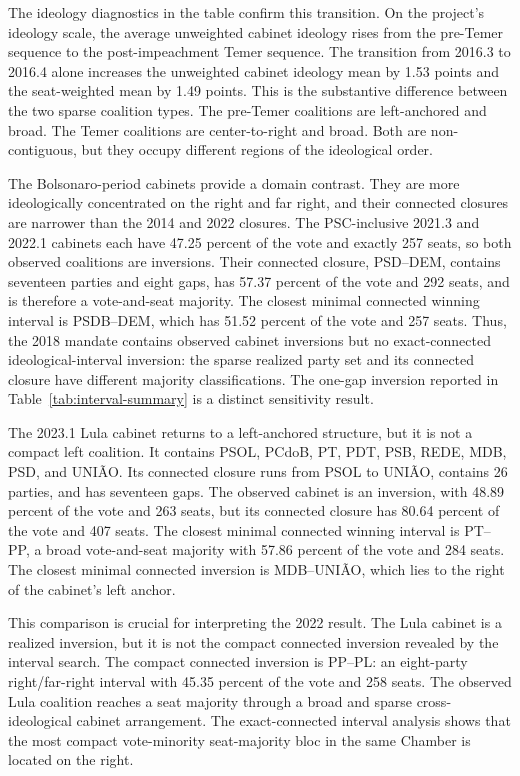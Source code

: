 \documentclass[11pt]{article}
\begin{document}
The ideology diagnostics in the table confirm this transition. On the project's
ideology scale, the average unweighted cabinet ideology rises from the
pre-Temer sequence to the post-impeachment Temer sequence. The transition from
2016.3 to 2016.4 alone increases the unweighted cabinet ideology mean by 1.53
points and the seat-weighted mean by 1.49 points. This is the substantive
difference between the two sparse coalition types. The pre-Temer coalitions are
left-anchored and broad. The Temer coalitions are center-to-right and broad.
Both are non-contiguous, but they occupy different regions of the ideological
order.

The Bolsonaro-period cabinets provide a domain contrast. They are more
ideologically concentrated on the right and far right, and their connected
closures are narrower than the 2014 and 2022 closures. The PSC-inclusive
2021.3 and 2022.1 cabinets each have 47.25 percent of the vote and exactly 257
seats, so both observed coalitions are inversions. Their connected closure,
PSD--DEM, contains seventeen parties and eight gaps, has 57.37 percent of the
vote and 292 seats, and is therefore a vote-and-seat majority. The closest
minimal connected winning interval is PSDB--DEM, which has 51.52 percent of the
vote and 257 seats. Thus, the 2018 mandate contains observed cabinet inversions
but no exact-connected ideological-interval inversion: the sparse realized
party set and its connected closure have different majority classifications.
The one-gap inversion reported in Table~\ref{tab:interval-summary} is a distinct
sensitivity result.


The 2023.1 Lula cabinet returns to a left-anchored structure, but it is not a
compact left coalition. It contains PSOL, PCdoB, PT, PDT, PSB, REDE, MDB,
PSD, and UNIÃO. Its connected closure runs from PSOL to UNIÃO, contains 26
parties, and has seventeen gaps. The observed cabinet is an inversion, with
48.89 percent of the vote and 263 seats, but its connected closure has 80.64
percent of the vote and 407 seats. The closest minimal connected winning
interval is PT--PP, a broad vote-and-seat majority with 57.86 percent of the
vote and 284 seats. The closest minimal connected inversion is MDB--UNIÃO,
which lies to the right of the cabinet's left anchor.

This comparison is crucial for interpreting the 2022 result. The Lula cabinet is
a realized inversion, but it is not the compact connected inversion revealed by
the interval search. The compact connected inversion is PP--PL: an eight-party
right/far-right interval with 45.35 percent of the vote and 258 seats. The
observed Lula coalition reaches a seat majority through a broad and sparse
cross-ideological cabinet arrangement. The exact-connected interval analysis shows
that the most compact vote-minority seat-majority bloc in the same Chamber is
located on the right.
\end{document}

